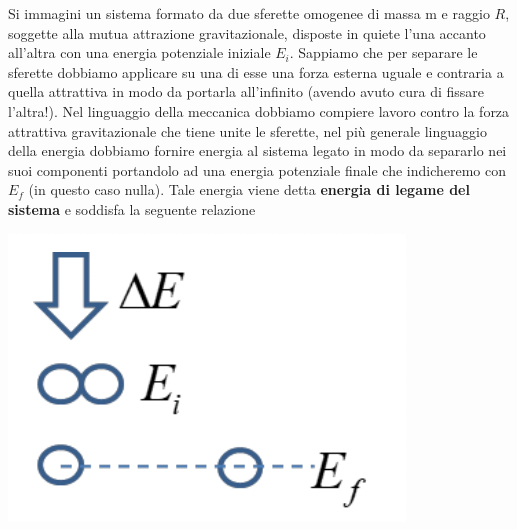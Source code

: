 Si immagini un sistema formato da due sferette omogenee di massa m e raggio $R$, soggette alla mutua attrazione gravitazionale, disposte in quiete l'una accanto all'altra con una energia potenziale iniziale $E_{i}$.
Sappiamo che per separare le sferette dobbiamo applicare su una di esse una forza esterna uguale e contraria a quella attrattiva in modo da portarla all'infinito (avendo avuto cura di fissare l'altra!).
Nel linguaggio della meccanica dobbiamo compiere lavoro contro la forza attrattiva gravitazionale che tiene unite le sferette, nel più generale linguaggio della energia dobbiamo fornire energia al sistema legato in modo da separarlo nei suoi componenti portandolo ad una energia potenziale finale che indicheremo con $E_{f}$ (in questo caso nulla).
Tale energia viene detta \textbf{energia di legame del sistema} e soddisfa la seguente relazione
\begin{marginfigure}
	\includegraphics{figs/en-legame}
	\label{fig:en-legame}
\end{marginfigure}


